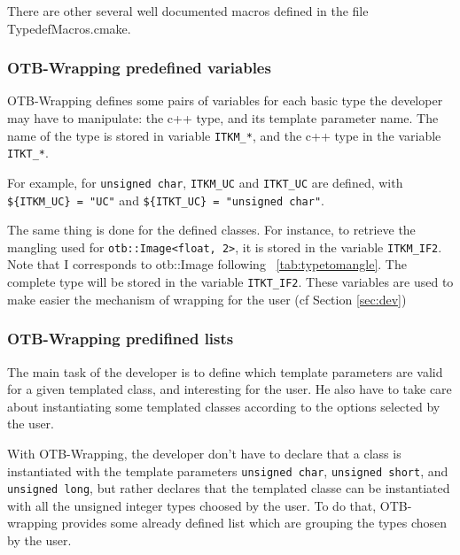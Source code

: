 There are other several well documented macros defined in the file TypedefMacros.cmake.


\subsubsection{OTB-Wrapping predefined variables}
OTB-Wrapping defines some pairs of variables for each basic type the developer may have
to manipulate: the c++ type, and its template parameter name. The name of the type
is stored in variable \verb$ITKM_*$, and the c++ type in the variable \verb$ITKT_*$.

For example, for \verb$unsigned char$, \verb$ITKM_UC$ and \verb$ITKT_UC$
are defined, with \verb|${ITKM_UC} = "UC"|  and \verb|${ITKT_UC} = "unsigned char"|.

The same thing is done for the defined classes. 
For instance, to retrieve the mangling used for  \verb|otb::Image<float, 2>|, 
it is stored in the variable  \verb|ITKM_IF2|.
Note that I corresponds to otb::Image following ~\ref{tab:typetomangle}.
The complete type will be stored in the variable \verb?ITKT_IF2?. 
These variables are used to make easier the mechanism of 
wrapping for the user (cf Section \ref{sec:dev})

 \subsubsection{OTB-Wrapping predifined lists}
The main task of the developer is to define which template parameters are valid for a given
templated class, and interesting for the user. He also have to take care about
instantiating some templated classes according to the options selected by the user.


With OTB-Wrapping, the developer don't have to declare that a class is instantiated with the template parameters
\verb$unsigned char$, \verb$unsigned short$, and \verb$unsigned long$, but rather declares that the
templated classe can be instantiated with all the unsigned integer types choosed by the user.
To do that, OTB-wrapping provides some already defined list which are grouping the types chosen by
the user.

